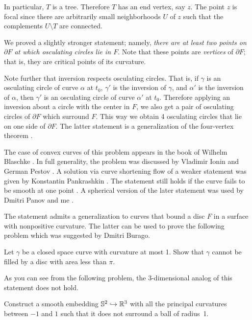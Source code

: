 In particular, $T$ is a tree.
Therefore $T$ has
an end vertex, say $z$.
The point $z$ is focal since there are arbitrarily small neighborhoods $U$ of $z$ such that the complements $U\setminus T$ are connected.
\qeds

We proved a slightly stronger statement;
namely, \textit{there are at least two points on $\partial F$ at which osculating circles lie in $F$}.
Note that these points are \emph{vertices} of $\partial F$;
that is, they are critical points of its curvature.

Note further that inversion respects osculating circles.
That is, if $\gamma$ is an osculating circle of curve $\alpha$ at $t_0$,
$\gamma'$ is the inversion of $\gamma$, and 
$\alpha'$ is the inversion of $\alpha$,
then $\gamma'$ is an osculating circle of curve $\alpha'$ at $t_0$.
Therefore applying an inversion about a circle with the center in $F$, we also get a pair of osculating circles of $\partial F$ which surround $F$.
This way we obtain 4 osculating circles that lie on one side of $\partial F$.
The latter statement is a generalization of the four-vertex theorem \cite{petrunin-zamora:moon}.

The case of convex curves of this problem appears in the book of Wilhelm Blaschke \cite[see \S 24 in][]{blaschke}.
In full generality, the problem was discussed by Vladimir Ionin and German Pestov \cite{pestov-ionin}. %
A solution via curve shortening flow of a weaker statement 
was given by Konstantin Pankrashkin \cite{pankrashkin}.
The statement still holds if the curve fails to be smooth at one point \cite{petrunin-zamora:moon}.
A spherical version of the later statement 
was used by Dmitri Panov and me \cite{panov-petrunin-ramification}.

The statement admits a generalization to curves that bound a disc $F$ in a surface with nonpositive curvature.
The latter can be used to prove the following problem which was suggested by Dmitri Burago.

\begin{pr}
Let $\gamma$ be a closed space curve with curvature at most 1.
Show that $\gamma$ cannot be filled by a disc with area less than $\pi$.
\end{pr}


As you can see from the following problem, the 3-dimensional analog of this statement does not hold.

\begin{pr}
Construct a smooth embedding $\mathbb{S}^2\hookrightarrow \mathbb{R}^3$ 
with all the principal curvatures between $-1$ and $1$
such that it does not surround a ball of radius~1.
\end{pr}


